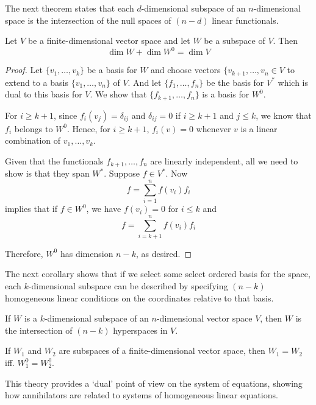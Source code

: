 The next theorem states that each $d$-dimensional subspace of an $n$-dimensional space is the intersection of the null spaces of $(n-d)$ linear functionals.

\begin{theorem}\label{thm:dim-annihilator}
	Let $V$ be a finite-dimensional vector space and let $W$ be a subspace of $V$. Then
	\[
		\dim W + \dim W^0 = \dim V
	\]
\end{theorem}

\begin{proof}
	Let $\{ v_1, \ldots, v_k \}$ be a basis for $W$ and choose vectors $\{ v_{k+1}, \ldots, v_n \in V$ to extend to a basis $\{ v_1, \ldots, v_n \}$ of $V$. And let $ \{ f_1, \ldots, f_n \}$ be the basis for $V^\ast$ which is dual to this basis for $V$. We show that $\{ f_{k+1}, \ldots, f_n \}$ is a basis for $W^0$.

	For $i \geq k+1$, since $f_i(v_j) = \delta_{ij}$ and $\delta_{ij} = 0$ if $i \geq k+1$ and $j \leq k$, we know that $f_i$ belongs to $W^0$. Hence, for $i \geq k+1$,  $f_i(v) = 0$ whenever $v$ is a linear combination of $v_1, \ldots, v_k$.

	Given that the functionals $f_{k+1}, \ldots, f_n$ are linearly independent, all we need to show is that they span $W^\ast$. Suppose $f \in V^\ast$. Now 
	\[
		f = \sum_{i=1}^n f(v_i)f_i
	\]
	implies that if $f \in W^0$, we have $f(v_i) = 0$ for $i \leq k$ and
	\[
		f = \sum_{i = k+1}^n f(v_i) f_i
	\]

	Therefore, $W^0$ has dimension $n-k$, as desired.
\end{proof}

The next corollary shows that if we select some select ordered basis for the space, each $k$-dimensional subspace can be described by specifying $(n-k)$ homogeneous linear conditions on the coordinates relative to that basis.

\begin{corollary}
	If $W$ is a $k$-dimensional subspace of an $n$-dimensional vector space $V$, then $W$ is the intersection of $(n-k)$ hyperspaces in $V$.
\end{corollary}

\begin{corollary}\label{cor:determined-annihilator}
	If $W_1$ and $W_2$ are subspaces of a finite-dimensional vector space, then $W_1 = W_2$ iff. $W_1^0 = W_2^0$.
\end{corollary}

This theory provides a `dual' point of view on the system of equations, showing how annihilators are related to systems of homogeneous linear equations.

